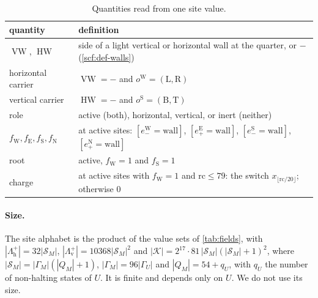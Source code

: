\begin{table}[ht]
\centering
\small
\begin{tabularx}{\textwidth}{@{}l>{\raggedright\arraybackslash}X@{}}
\toprule
quantity & definition\\
\midrule
$\operatorname{VW}$, $\operatorname{HW}$ & side of a light vertical or horizontal wall at the quarter, or $-$ (\cref{scf:def-walls})\\
horizontal carrier & $\operatorname{VW}=-$ and $o^{\mathrm W}=(\mathrm L,\mathrm R)$\\
vertical carrier & $\operatorname{HW}=-$ and $o^{\mathrm S}=(\mathrm B,\mathrm T)$\\
role & active (both), horizontal, vertical, or inert (neither)\\
$f_{\mathrm W},f_{\mathrm E},f_{\mathrm S},f_{\mathrm N}$ & at active sites: $[e^{\mathrm W}_-=\mathrm{wall}]$, $[e^{\mathrm E}_+=\mathrm{wall}]$, $[e^{\mathrm S}_-=\mathrm{wall}]$, $[e^{\mathrm N}_+=\mathrm{wall}]$\\
root & active, $f_{\mathrm W}=1$ and $f_{\mathrm S}=1$\\
charge & at active sites with $f_{\mathrm W}=1$ and $\mathrm{rc}\le79$: the switch $x_{\lfloor\mathrm{rc}/20\rfloor}$; otherwise $0$\\
\bottomrule
\end{tabularx}
\caption{Quantities read from one site value.}
\label{tab:derived}
\end{table}

\paragraph{Size.} The site alphabet is the product of the value sets of \cref{tab:fields}, with $|\Lambda^+_{\mathrm h}|=32|\mathcal S_M|$, $|\Lambda^+_{\mathrm v}|=10368|\mathcal S_M|^2$ and $|\mathcal K|=2^{17}\cdot81\,|\mathcal S_M|(|\mathcal S_M|+1)^2$, where $|\mathcal S_M|=|\Gamma_M|(|Q_M|+1)$, $|\Gamma_M|=96|\Gamma_U|$ and $|Q_M|=54+q_U$, with $q_U$ the number of non-halting states of $U$. It is finite and depends only on $U$. We do not use its size.
